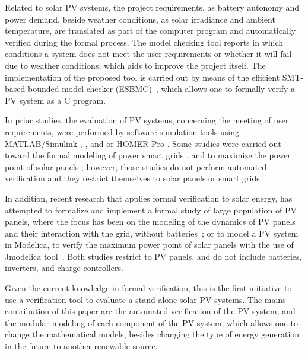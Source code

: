 \documentclass[journal]{IEEEtran}
\begin{document}
Related to solar PV systems, the project requirements, as battery autonomy and power demand, beside weather conditions, as solar irradiance and ambient temperature, are translated as part of the computer program and automatically verified during the formal process. The model checking tool reports in which conditions a system does not meet the user requirements or whether it will fail due to weather conditions, which aids to improve the project itself.  
The implementation of the proposed tool is carried out by means of the efficient SMT-based bounded model checker (ESBMC)~\cite{esbmc2018}, which allows one to formally verify a PV system as a C program.

In prior studies, the evaluation of PV systems, concerning the meeting of user requirements, were performed by software simulation tools using MATLAB/Simulink \cite{Benatiallah2017}, \cite{Samrat2014}, and \cite{Natsheh2012} or HOMER Pro \cite{Lamnadi2017}. Some studies were carried out toward the formal modeling of power smart grids \cite{Akram2018}, and to maximize the power point of solar panels \cite{Driouich2017}; however, those studies do not perform automated verification and they restrict themselves to solar panels or smart grids. 

In addition, recent research that applies formal verification to solar energy, has attempted to formalize and implement a formal study of large population of PV panels, where the focus has been on the modeling of the dynamics of PV panels and their interaction with the grid, without batteries~\cite{Abate2017}; or to model a PV system in Modelica, to verify the maximum power point of solar panels with the use of Jmodelica tool~\cite{Driouich2018}. Both studies restrict to PV panels, and do not include batteries, inverters, and charge controllers.
  
Given the current knowledge in formal verification, this is the first initiative to use a verification tool to evaluate a stand-alone solar PV systems. %
The mains contribution of this paper are the automated verification of the PV system, and the modular modeling of each component of the PV system, which allows one to change the mathematical models, besides changing the type of energy generation in the future to another renewable source.
\end{document}
